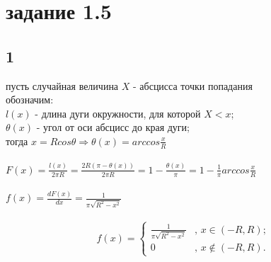 \documentclass[a4paper]{article}
\begin{document}
	\section*{задание 1.5}
	\begin{large}
		\subsection*{1}
		пусть случайная величина $X$ - абсцисса точки попадания\\
		обозначим:\\
		$l(x)$ - длина дуги окружности, для которой $X<x$;\\
		$\theta(x)$ - угол от оси абсцисс до края дуги;\\
		тогда $x = Rcos\theta \Rightarrow \theta(x) = arccos\frac{x}{R}$\\
		\\
		$F(x) = \frac{l(x)}{2\pi R} = \frac{2R(\pi - \theta(x))}{2\pi R} = 1-\frac{\theta(x)}{\pi} = 1-\frac{1}{\pi}arccos\frac{x}{R}$\\
		\\
		$f(x) = \frac{dF(x)}{dx} = \frac{1}{\pi \sqrt{R^2-x^2}}$\\
		\\
		\[ f(x) = \left\{ \begin{array}{ll}
			\frac{1}{\pi \sqrt{R^2-x^2}} & \mbox{, $x \in (-R, R)$};\\
			0 & \mbox{, $x \notin (-R, R)$}.\end{array} \right. \]

\end{large}
\end{document}
